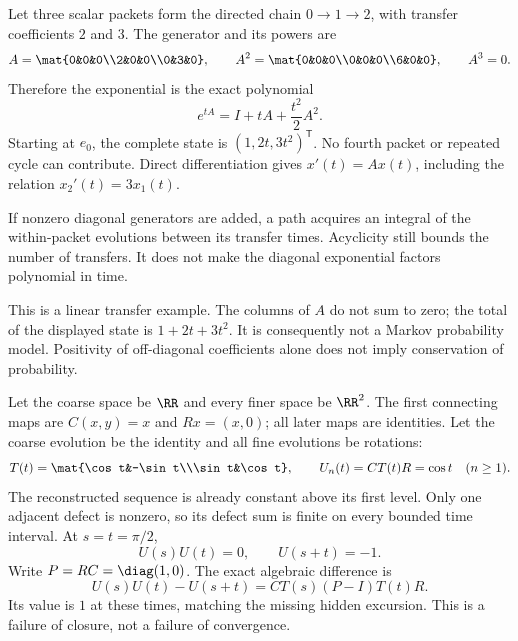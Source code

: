 Let three scalar packets form the directed chain $0\to1\to2$, with transfer coefficients $2$ and $3$. The generator and its powers are
\[
A=\mat{0&0&0\\2&0&0\\0&3&0},\qquad
A^2=\mat{0&0&0\\0&0&0\\6&0&0},\qquad A^3=0.
\]
Therefore the exponential is the exact polynomial
\[
e^{tA}=I+tA+\frac{t^2}{2}A^2.
\]
Starting at $e_0$, the complete state is $(1,2t,3t^2)^{\mathsf T}$. No fourth packet or repeated cycle can contribute. Direct differentiation gives $x'(t)=Ax(t)$, including the relation $x_2'(t)=3x_1(t)$.

If nonzero diagonal generators are added, a path acquires an integral of the within-packet evolutions between its transfer times. Acyclicity still bounds the number of transfers. It does not make the diagonal exponential factors polynomial in time.

This is a linear transfer example. The columns of $A$ do not sum to zero; the total of the displayed state is $1+2t+3t^2$. It is consequently not a Markov probability model. Positivity of off-diagonal coefficients alone does not imply conservation of probability.

Let the coarse space be $\RR$ and every finer space be $\RR^2$. The first connecting maps are $C(x,y)=x$ and $Rx=(x,0)$; all later maps are identities. Let the coarse evolution be the identity and all fine evolutions be rotations:
\[
T(t)=\mat{\cos t&-\sin t\\\sin t&\cos t},\qquad
U_n(t)=CT(t)R=\cos t\quad(n\ge1).
\]
The reconstructed sequence is already constant above its first level. Only one adjacent defect is nonzero, so its defect sum is finite on every bounded time interval.
At $s=t=\pi/2$,
\[
U(s)U(t)=0,\qquad U(s+t)=-1.
\]
Write $P=RC=\diag(1,0)$. The exact algebraic difference is
\[
U(s)U(t)-U(s+t)=CT(s)(P-I)T(t)R.
\]
Its value is $1$ at these times, matching the missing hidden excursion. This is a failure of closure, not a failure of convergence.

